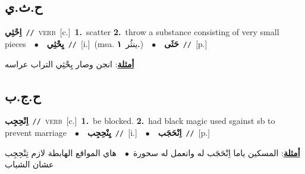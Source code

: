 \documentclass[10pt,a4paper,twoside]{article} %
\begin{document}
\begin{multicols}{2}
{{{{{{{{{\vspace{-3mm}
\subsection*{\color{blue}\foreignlanguage{arabic}{ح.ث.ي}\color{blue}{}} 

{\setlength\topsep{0pt}\textbf{\foreignlanguage{arabic}{اِحْثِي}}\ {\color{gray}\texttt{//}\color{black}}\ \textsc{verb}\ [c.]\ \textbf{1.}~scatter  \textbf{2.}~throw a substance consisting of very small pieces\ \ $\bullet$\ \ \setlength\topsep{0pt}\textbf{\foreignlanguage{arabic}{يِحْثِي}}\ {\color{gray}\texttt{//}\color{black}}\ [i.]\ \color{gray}(msa. \foreignlanguage{arabic}{ينثُر}~\foreignlanguage{arabic}{\textbf{١.}})\color{black}\ \ $\bullet$\ \ \setlength\topsep{0pt}\textbf{\foreignlanguage{arabic}{حَثَى}}\ {\color{gray}\texttt{//}\color{black}}\ [p.]\  \begin{flushright}\color{gray}\foreignlanguage{arabic}{\textbf{\underline{\foreignlanguage{arabic}{أمثلة}}}: انجن وصار يِحْثِي التراب عراسه}\end{flushright}\color{black}} \vspace{2mm}

\vspace{-3mm}
\subsection*{\color{blue}\foreignlanguage{arabic}{ح.ج.ب}\color{blue}{}} 

{\setlength\topsep{0pt}\textbf{\foreignlanguage{arabic}{اِنْحِجِب}}\ {\color{gray}\texttt{//}\color{black}}\ \textsc{verb}\ [c.]\ \textbf{1.}~be blocked.  \textbf{2.}~had black magic used sgainst sb to prevent marriage\ \ $\bullet$\ \ \setlength\topsep{0pt}\textbf{\foreignlanguage{arabic}{يِنْحِجِب}}\ {\color{gray}\texttt{//}\color{black}}\ [i.]\ \ $\bullet$\ \ \setlength\topsep{0pt}\textbf{\foreignlanguage{arabic}{اِنْحَجَب}}\ {\color{gray}\texttt{//}\color{black}}\ [p.]\  \begin{flushright}\color{gray}\foreignlanguage{arabic}{\textbf{\underline{\foreignlanguage{arabic}{أمثلة}}}: المسكين ياما اِنْحَجَب له وانعمل له سحورة\ $\bullet$\ \  هاي المواقع الهابطة لازم تِنْحِجِب عشان الشباب}\end{flushright}\color{black}} \vspace{2mm}

}}}}}}}}}
\end{multicols}
\end{document}
